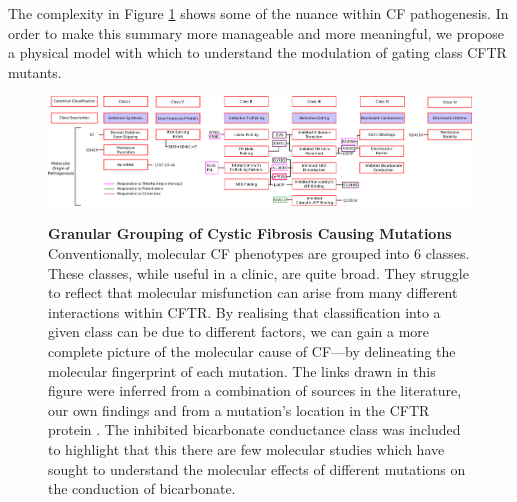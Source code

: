 The complexity in Figure \ref{granular_classification} shows some of the nuance within CF pathogenesis. In order to make this summary more manageable and more meaningful, we propose a physical model with which to understand the modulation of gating class CFTR mutants. 

\begin{landscape}
\begin{figure}
	\begin{center}
	\includegraphics[width=1.5\textwidth]{figures/perspective/classes_mutations.pdf}\\
	\end{center}
	\captionsetup{singlelinecheck = false, justification=raggedright}
	\caption[Granular grouping of CF pathogenesis]{\textbf{Granular Grouping of Cystic Fibrosis Causing Mutations}{ Conventionally, molecular CF phenotypes are grouped into 6 classes. These classes, while useful in a clinic, are quite broad. They struggle to reflect that molecular misfunction can arise from many different interactions within CFTR. By realising that classification into a given class can be due to different factors, we can gain a more complete picture of the molecular cause of CF---by delineating the molecular fingerprint of each mutation. The links drawn in this figure were inferred from a combination of sources in the literature, our own findings and from a mutation's location in the CFTR protein \cite{bompadre2007, yeh2019a, gong2004, wong2022, vangoor2009, vangoor2014, hoffmann2018, thelin2007, gene2008, trikafta_website, phuan2018, ensinck2022}. The inhibited bicarbonate conductance class was included to highlight that this there are few molecular studies which have sought to understand the molecular effects of different mutations on the conduction of bicarbonate. }
	}

	\label{granular_classification}
\end{figure}
\end{landscape}

